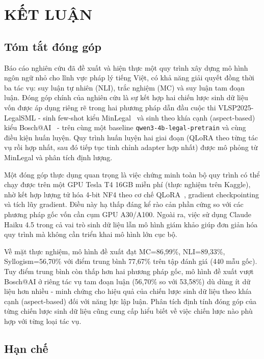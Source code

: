\chapter*{KẾT LUẬN}

\section*{Tóm tắt đóng góp}

Báo cáo nghiên cứu đã đề xuất và hiện thực một quy trình xây dựng mô hình ngôn ngữ nhỏ cho lĩnh vực pháp lý tiếng Việt, có khả năng giải quyết đồng thời ba tác vụ: suy luận tự nhiên (NLI), trắc nghiệm (MC) và suy luận tam đoạn luận. Đóng góp chính của nghiên cứu là sự kết hợp hai chiến lược sinh dữ liệu vốn được áp dụng riêng rẽ trong hai phương pháp dẫn đầu cuộc thi VLSP2025-LegalSML - sinh few-shot kiểu MinLegal~\cite{luan2025minlegal} và sinh theo khía cạnh (aspect-based) kiểu Bosch@AI~\cite{quang2025bosch} - trên cùng một baseline \texttt{qwen3-4b-legal-pretrain} và cùng điều kiện huấn luyện. Quy trình huấn luyện hai giai đoạn (QLoRA theo từng tác vụ rồi hợp nhất, sau đó tiếp tục tinh chỉnh adapter hợp nhất) được mô phỏng từ MinLegal và phân tích định lượng.

Một đóng góp thực dụng quan trọng là việc chứng minh toàn bộ quy trình có thể chạy được trên một GPU Tesla T4 16GB miễn phí (thực nghiệm trên Kaggle), nhờ kết hợp lượng tử hóa 4-bit NF4 theo cơ chế QLoRA~\cite{dettmers2023qlora}, gradient checkpointing và tích lũy gradient. Điều này hạ thấp đáng kể rào cản phần cứng so với các phương pháp gốc vốn cần cụm GPU A30/A100. Ngoài ra, việc sử dụng Claude Haiku 4.5 trong cả vai trò sinh dữ liệu lẫn mô hình giám khảo giúp đơn giản hóa quy trình mà không cần triển khai mô hình lớn cục bộ.

Về mặt thực nghiệm, mô hình đề xuất đạt MC=86,99\%, NLI=89,33\%, Syllogism=56,70\% với điểm trung bình 77,67\% trên tập đánh giá (440 mẫu gốc). Tuy điểm trung bình còn thấp hơn hai phương pháp gốc, mô hình đề xuất vượt Bosch@AI ở riêng tác vụ tam đoạn luận (56,70\% so với 53,58\%) dù dùng ít dữ liệu hơn nhiều - minh chứng cho hiệu quả của chiến lược sinh dữ liệu theo khía cạnh (aspect-based) đối với năng lực lập luận. Phân tích định tính đóng góp của từng chiến lược sinh dữ liệu cũng cung cấp hiểu biết về việc chiến lược nào phù hợp với từng loại tác vụ.

\section*{Hạn chế}

